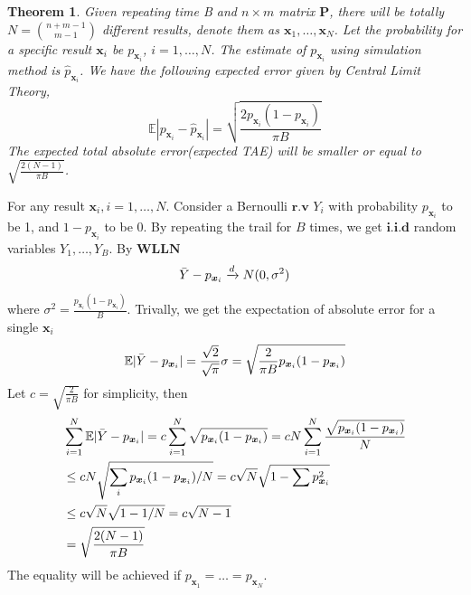 \documentclass[12pt]{article}
\newcommand{\EE}{\mathbb{E}}
\newcommand{\Pmat}{\mathbf{P}}
\newcommand{\wh}{\widehat}
\newtheorem{thm}{Theorem}
\begin{document}
\begin{thm}
Given repeating time \mbox{B} and $n \times m$ matrix $\Pmat$, there will be totally  $N=\binom{n+m-1}{m-1}$ different results, denote them as  $\boldsymbol{x}_1,\dots,\boldsymbol{x}_N$. Let the probability for a specific result $\boldsymbol{x}_{i}$ be $p_{\boldsymbol{x}_{i}}$, $i=1,\dots,N$. The estimate of  $p_{\boldsymbol{x}_{i}}$ using simulation method is $\wh{p}_{\boldsymbol{x}_i}$. We have the following expected error given by Central Limit Theory,
\begin{equation*}
    \EE|p_{\boldsymbol{x}_i} - \wh{p}_{\boldsymbol{x}_i}| =  \sqrt{\frac{2 p_{\boldsymbol{x}_i}(1-p_{\boldsymbol{x}_i})}{\pi B}}
\end{equation*}
The expected total absolute error(expected \mbox{TAE}) will be smaller or equal to
$\sqrt{\frac{2(N-1)}{\pi B}}$.
\end{thm}
For any result $\boldsymbol{x}_i,i=1,\dots,N$. Consider a Bernoulli $\textbf{r.v}$ $Y_i$ with probability $p_{\boldsymbol{x}_i}$ to be 1, and $1-p_{\boldsymbol{x}_i}$ to be 0. By repeating the trail for $B$ times, we get $\textbf{i.i.d}$ random variables $Y_1,\dots,Y_{B}$. By $\textbf{WLLN}$
\begin{equation*}
    \Bar{Y}-p_{\boldsymbol{x}_i} \xrightarrow{d} N(0,\sigma^2)
\end{equation*}
where $\sigma^2 = \frac{p_{\boldsymbol{x}_i}(1-p_{\boldsymbol{x}_i})}{B}$. Trivally, we get the expectation of absolute error for a single $\boldsymbol{x}_i$
\begin{equation*}
    \EE |\Bar{Y}-p_{\boldsymbol{x}_i}| = \frac{\sqrt{2}}{\sqrt{\pi}}\sigma = \sqrt{\frac{2}{\pi B}p_{\boldsymbol{x}_i}(1-p_{\boldsymbol{x}_i})}
\end{equation*}
Let $c = \sqrt{\frac{2}{\pi B}}$ for simplicity, then
\begin{align*}
    & \sum_{i=1}^{N}\EE |\Bar{Y}-p_{\boldsymbol{x}_i}| = c \sum_{i=1}^{N} \sqrt{p_{\boldsymbol{x}_i}(1-p_{\boldsymbol{x}_i})}  = c N \sum_{i=1}^{N}\frac{\sqrt{p_{\boldsymbol{x}_i}(1-p_{\boldsymbol{x}_i})}}{N} \\
    & \leq c N \sqrt{\sum_{i}p_{\boldsymbol{x}_i}(1-p_{\boldsymbol{x}_i})/N} = c \sqrt{N} \sqrt{1-\sum p_{\boldsymbol{x}_{i}}^2}\\ &\leq c \sqrt{N} \sqrt{1-1/N} = c\sqrt{N-1}\\
    & = \sqrt{\frac{2(N-1)}{\pi B}}
\end{align*}
The equality will be achieved if $p_{\boldsymbol{x}_1} = \dots = p_{\boldsymbol{x}_N}$.
\end{document}
